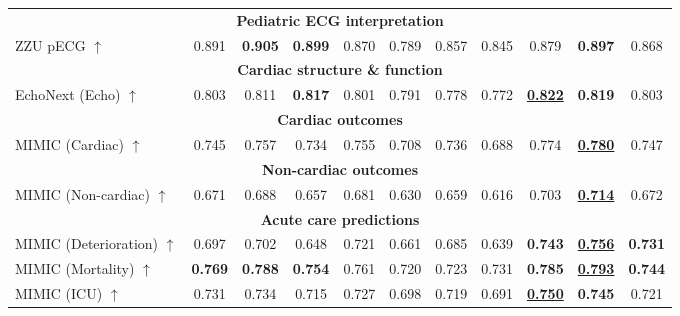 \documentclass{article}
\begin{document}
\begin{table}[t]
\begin{tabular}{lcccccccccc}
                    \multicolumn{11}{c}{\textbf{Pediatric ECG interpretation }} \\
                    ZZU pECG $\uparrow$ & 0.891 & \textbf{0.905} & \textbf{0.899} & 0.870 & 0.789 & 0.857 & 0.845 & 0.879 & \textbf{0.897} & 0.868 \\
                    \midrule
        
                    \multicolumn{11}{c}{\textbf{Cardiac structure \& function }} \\
                    EchoNext (Echo) $\uparrow$ & 0.803 & 0.811 & \textbf{0.817} & 0.801 & 0.791 & 0.778 & 0.772 & \underline{\textbf{0.822}} & \textbf{0.819} & 0.803 \\
                    \midrule
        
                    \multicolumn{11}{c}{\textbf{Cardiac outcomes}} \\
                    MIMIC (Cardiac) $\uparrow$ & 0.745 & 0.757 & 0.734 & 0.755 & 0.708 & 0.736 & 0.688 & 0.774 & \textbf{\underline{0.780}} & 0.747 \\
                    \midrule
                                
                    \multicolumn{11}{c}{\textbf{Non-cardiac outcomes}} \\
                    MIMIC (Non-cardiac) $\uparrow$ & 0.671 & 0.688 & 0.657 & 0.681 & 0.630 & 0.659 & 0.616 & 0.703 & \textbf{\underline{0.714}} & 0.672 \\
                    \midrule
                                
                    \multicolumn{11}{c}{\textbf{Acute care predictions}} \\
                    MIMIC (Deterioration) $\uparrow$ & 0.697 & 0.702 & 0.648 & 0.721 & 0.661 & 0.685 & 0.639 & \textbf{0.743} & \textbf{\underline{0.756}} & \textbf{0.731} \\
                    MIMIC (Mortality) $\uparrow$ & \textbf{0.769} & \textbf{0.788} & \textbf{0.754} & 0.761 & 0.720 & 0.723 & 0.731 & \textbf{0.785} & \textbf{\underline{0.793}} & \textbf{0.744} \\
                    MIMIC (ICU) $\uparrow$ & 0.731 & 0.734 & 0.715 & 0.727 & 0.698 & 0.719 & 0.691 & \textbf{\underline{0.750}} & \textbf{0.745} & 0.721 \\
                    \midrule
                                

\end{tabular}
\end{table}
\end{document}
